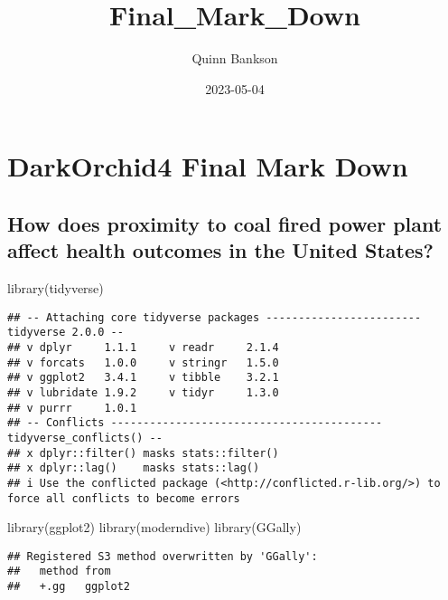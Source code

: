 \documentclass[
]{article}
\title{Final\_Mark\_Down}
\author{Quinn Bankson}
\date{2023-05-04}
\newenvironment{Shaded}{\begin{snugshade}}{\end{snugshade}}
\newcommand{\FunctionTok}[1]{\textcolor[rgb]{0.00,0.00,0.00}{#1}}
\newcommand{\NormalTok}[1]{#1}
\begin{document}
\maketitle

\hypertarget{darkorchid4-final-mark-down}{%
\section{DarkOrchid4 Final Mark
Down}\label{darkorchid4-final-mark-down}}

\hypertarget{how-does-proximity-to-coal-fired-power-plant-affect-health-outcomes-in-the-united-states}{%
\subsection{How does proximity to coal fired power plant affect health
outcomes in the United
States?}\label{how-does-proximity-to-coal-fired-power-plant-affect-health-outcomes-in-the-united-states}}

\begin{Shaded}
\begin{Highlighting}[]
\FunctionTok{library}\NormalTok{(tidyverse)}
\end{Highlighting}
\end{Shaded}

\begin{verbatim}
## -- Attaching core tidyverse packages ------------------------ tidyverse 2.0.0 --
## v dplyr     1.1.1     v readr     2.1.4
## v forcats   1.0.0     v stringr   1.5.0
## v ggplot2   3.4.1     v tibble    3.2.1
## v lubridate 1.9.2     v tidyr     1.3.0
## v purrr     1.0.1     
## -- Conflicts ------------------------------------------ tidyverse_conflicts() --
## x dplyr::filter() masks stats::filter()
## x dplyr::lag()    masks stats::lag()
## i Use the conflicted package (<http://conflicted.r-lib.org/>) to force all conflicts to become errors
\end{verbatim}

\begin{Shaded}
\begin{Highlighting}[]
\FunctionTok{library}\NormalTok{(ggplot2)}
\FunctionTok{library}\NormalTok{(moderndive)}
\FunctionTok{library}\NormalTok{(GGally)}
\end{Highlighting}
\end{Shaded}

\begin{verbatim}
## Registered S3 method overwritten by 'GGally':
##   method from   
##   +.gg   ggplot2
\end{verbatim}
\end{document}

